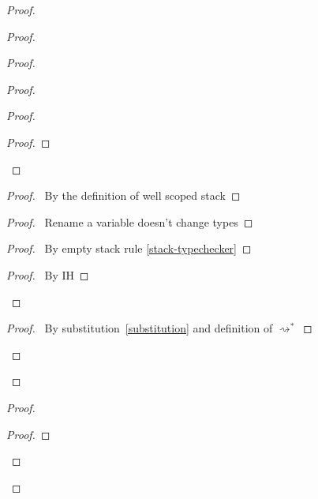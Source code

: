 \documentclass[a4paper]{article}
\begin{document}
\begin{proof}
\begin{proof}
\begin{proof}
\begin{proof}
\begin{proof}
\begin{proof}
          \end{proof}
        \end{proof}
        \begin{proof}
          \pf\ By the definition of well scoped stack
        \end{proof}
        \begin{proof}
          \pf\ Rename a variable doesn't change types
        \end{proof}
        \begin{proof}
          \pf\ By empty stack rule \ref{stack-typechecker}
        \end{proof}
        \qedstep
        \begin{proof}
          \pf\ By IH
        \end{proof}
      \end{proof}
      \begin{proof}
        \pf\ By substitution~\ref{substitution} and definition of $\rightsquigarrow^*$
      \end{proof}
    \end{proof}
  \end{proof}
  \begin{proof}
    \begin{proof}

\end{proof}
\end{proof}
\end{proof}
\end{document}
